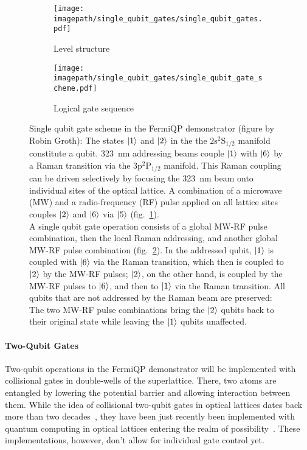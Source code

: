 \begin{figure}
    \centering
    \hspace{2.2cm}
    \begin{subfigure}[t]{0.25\textwidth}
        \centering
        \texttt{[image: \\imagepath/single\_qubit\_gates/single\_qubit\_gates.pdf]}
        \caption{Level structure}
        \label{fig:single_qubit_gates_levels}
    \end{subfigure}
    \begin{subfigure}[t]{0.55\textwidth}
        \centering
        \texttt{[image: \\imagepath/single\_qubit\_gates/single\_qubit\_gate\_scheme.pdf]}
        \caption{Logical gate sequence}
        \label{fig:single_qubit_gate_scheme}
    \end{subfigure}
    
    \caption{Single qubit gate scheme in the FermiQP demonstrator (figure by Robin Groth): The states $\Ket{1}$ and $\Ket{2}$ in the the $2\text{s} ^2\text{S}_{1/2}$ manifold constitute a qubit.
    \SI[]{323}{\nano\meter} addressing beams couple $\Ket{1}$ with $\Ket{6}$ by a Raman transition via the $3\text{p} ^2\text{P}_{1/2}$ manifold. This Raman coupling can be driven selectively by focusing the \SI[]{323}{\nano\meter} beam onto individual sites of the optical lattice.
    A combination of a microwave (MW) and a radio-frequency (RF) pulse applied on all lattice sites couples $\Ket{2}$ and $\Ket{6}$ via $\Ket{5}$ (fig.~\ref{fig:single_qubit_gates_levels}).\\
    A single qubit gate operation consists of a global MW-RF pulse combination, then the local Raman addressing, and another global MW-RF pulse combination (fig.~\ref{fig:single_qubit_gate_scheme}).
    In the addressed qubit, $\Ket{1}$ is coupled with $\Ket{6}$ via the Raman transition, which then is coupled to $\Ket{2}$ by the MW-RF pulses; $\Ket{2}$, on the other hand, is coupled by the MW-RF pulses to $\Ket{6}$, and then to $\Ket{1}$ via the Raman transition.
    All qubits that are not addressed by the Raman beam are preserved: The two MW-RF pulse combinations bring the $\Ket{2}$ qubits back to their original state while leaving the $\Ket{1}$ qubits unaffected.}
    \label{fig:single_qubit_gates}
\end{figure}

\paragraph*{Two-Qubit Gates}
Two-qubit operations in the FermiQP demonstrator will be implemented with collisional gates in double-wells of the superlattice. There, two atoms are entangled by lowering the potential barrier and allowing interaction between them. While the idea of collisional two-qubit gates in optical lattices dates back more than two decades~\cite{jaksch_fast_2000, anderlini_controlled_2006,trotzky_time-resolved_2008}, they have been just recently been implemented with quantum computing in optical lattices entering the realm of possibility~\cite{dai_generation_2016, yang_cooling_2020, zhang_functional_2022}. These implementations, however, don't allow for individual gate control yet.

